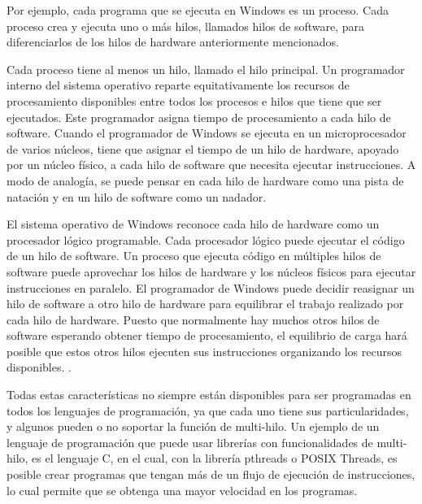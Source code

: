\documentclass[12pt]{article}
\begin{document}
{Por ejemplo, cada programa que se ejecuta en Windows es un proceso. Cada proceso crea y ejecuta uno o más hilos, llamados hilos de software, para diferenciarlos de los hilos de hardware anteriormente mencionados.
\newline

Cada proceso tiene al menos un hilo, llamado el hilo principal. Un programador interno del sistema operativo reparte equitativamente los recursos de procesamiento disponibles entre todos los procesos e hilos que tiene que ser ejecutados. Este programador asigna tiempo de procesamiento a cada hilo de software. Cuando el programador de Windows se ejecuta en un microprocesador de varios núcleos, tiene que asignar el tiempo de un hilo de hardware, apoyado por un núcleo físico, a cada hilo de software que necesita ejecutar instrucciones. A modo de analogía, se puede pensar en cada hilo de hardware como una pista de natación y en un hilo de software como un nadador.\citep{vs}
\newline

El sistema operativo de Windows reconoce cada hilo de hardware como un procesador lógico programable. Cada procesador lógico puede ejecutar el código de un hilo de software. Un proceso que ejecuta código en múltiples hilos de software puede aprovechar los hilos de hardware y los núcleos físicos para ejecutar instrucciones en paralelo. El programador de Windows puede decidir reasignar un hilo de software a otro hilo de hardware para equilibrar el trabajo realizado por cada hilo de hardware. Puesto que normalmente hay muchos otros hilos de software esperando obtener  tiempo de procesamiento, el equilibrio de carga hará posible que estos otros hilos ejecuten sus instrucciones organizando los recursos disponibles.
\citep{vs}.
\newline

Todas estas características no siempre están disponibles para ser programadas en todos los lenguajes de programación, ya que cada uno tiene sus particularidades, y algunos pueden o no soportar la función de multi-hilo. Un ejemplo de un lenguaje de programación que puede usar librerías con funcionalidades de multi-hilo, es el lenguaje C, en el cual, con la librería pthreads o POSIX Threads, es posible crear programas que tengan más de un flujo de ejecución de instrucciones, lo cual permite que se obtenga una mayor velocidad en los programas.


\medskip

 



}
\end{document}
